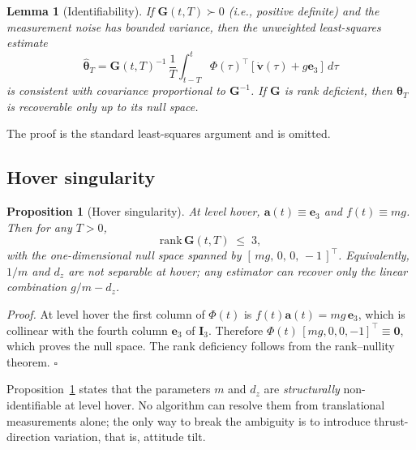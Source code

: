 \documentclass[lettersize,journal]{IEEEtran}
\newtheorem{proposition}{Proposition}
\newtheorem{lemma}{Lemma}
\renewenvironment{proof}{\noindent\textit{Proof.}}{\hfill$\square$\medskip}
\newcommand{\vect}[1]{\bm{#1}}
\newcommand{\mat}[1]{\mathbf{#1}}
\begin{document}
\begin{lemma}[Identifiability]\label{lem:idf}
If $\mat G(t,T)\succ 0$ (i.e., positive definite) and the
measurement noise has bounded variance, then the unweighted
least-squares estimate
\[
\hat{\vect\theta}_T = \mat G(t,T)^{-1}\,\frac{1}{T}\int_{t-T}^{t}\!\!\Phi(\tau)^\top[\dot{\vect v}(\tau)+g\vect e_3]\,d\tau
\]
is consistent with covariance proportional to $\mat G^{-1}$.  If
$\mat G$ is rank deficient, then $\vect\theta_T$ is recoverable
only up to its null space.
\end{lemma}
\noindent The proof is the standard least-squares argument and is
omitted.

\subsection{Hover singularity}
\begin{proposition}[Hover singularity]\label{prop:hover}
At level hover, $\vect a(t)\equiv\vect e_3$ and
$f(t)\equiv mg$.  Then for any $T>0$,
\[
\mathrm{rank}\,\mat G(t,T) \;\le\; 3,
\]
with the one-dimensional null space spanned by
$[\,mg,\,0,\,0,\,-1\,]^\top$.  Equivalently, $1/m$ and $d_z$ are
not separable at hover; any estimator can recover only the linear
combination $g/m - d_z$.
\end{proposition}
\begin{proof}
At level hover the first column of $\Phi(t)$ is
$f(t)\vect a(t)=mg\,\vect e_3$, which is collinear with the
fourth column $\vect e_3$ of $\mat I_3$.  Therefore
$\Phi(t)\,[mg,0,0,-1]^\top \equiv \vect 0$, which proves the null
space.  The rank deficiency follows from the rank--nullity
theorem.
\end{proof}

\noindent Proposition~\ref{prop:hover} states that the parameters
$m$ and $d_z$ are \emph{structurally} non-identifiable at level
hover.  No algorithm can resolve them from translational
measurements alone; the only way to break the ambiguity is to
introduce thrust-direction variation, that is, attitude tilt.
\end{document}
